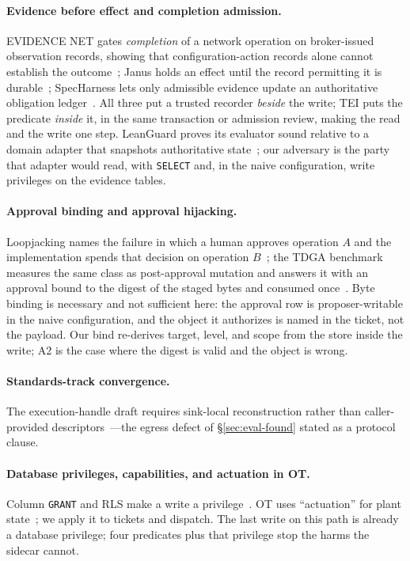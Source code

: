 \documentclass[acmsmall,manuscript,review,anonymous]{acmart}
\renewcommand{\_}{\discretionary{\textunderscore}{}{\textunderscore}}
\begin{document}
\paragraph{Evidence before effect and completion admission.}
{EVIDENCE NET} gates \emph{completion} of a network operation on
broker-issued observation records, showing that configuration-action
records alone cannot establish the outcome~\cite{zhang2026evidencenet};
Janus holds an effect until the record permitting it is
durable~\cite{arslan2026janus}; SpecHarness lets only admissible evidence
update an authoritative obligation ledger~\cite{li2026pen}. All three put a
trusted recorder \emph{beside} the write; {TEI} puts the predicate
\emph{inside} it, in the same transaction or admission review, making the
read and the write one step. LeanGuard proves its evaluator sound relative
to a domain adapter that snapshots authoritative
state~\cite{sankar2026leanguard}; our adversary is the party that adapter
would read, with \texttt{SELECT} and, in the naive configuration, write
privileges on the evidence tables.

\paragraph{Approval binding and approval hijacking.}
Loopjacking names the failure in which a human approves operation $A$ and
the implementation spends that decision on operation
$B$~\cite{kumar2026loopjacking}; the {TDGA} benchmark measures the same
class as post-approval mutation and answers it with an approval bound to
the digest of the staged bytes and consumed once~\cite{jing2026duties}.
Byte binding is necessary and not sufficient here: the approval row is
proposer-writable in the naive configuration, and the object it authorizes
is named in the ticket, not the payload. Our bind re-derives target, level,
and scope from the store inside the write; {A2} is the case where the
digest is valid and the object is wrong.

\paragraph{Standards-track convergence.}
The execution-handle draft requires sink-local reconstruction rather than
caller-provided descriptors~\cite{das2026executionhandle}---the egress
defect of \S\ref{sec:eval-found} stated as a protocol clause.

\paragraph{Database privileges, capabilities, and actuation in OT.}
Column \texttt{GRANT} and RLS make a write a privilege~\cite{postgresql-rls}.
OT uses ``actuation'' for plant
state~\cite{stouffer2015guide}; we apply it to tickets and dispatch.
The last write on this path is already a database privilege; four
predicates plus that privilege stop the harms the sidecar cannot.
\end{document}
